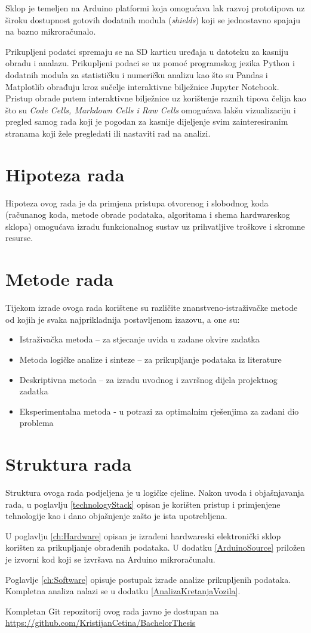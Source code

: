 Sklop je temeljen na Arduino platformi koja omogućava lak razvoj prototipova uz široku dostupnost gotovih dodatnih modula (\textit{shields}) koji se jednostavno spajaju na bazno mikroračunalo.

Prikupljeni podatci spremaju se na SD karticu uređaja u datoteku za kasniju obradu i analazu.
Prikupljeni podaci se uz pomoć programskog jezika Python i dodatnih modula za statističku i numeričku analizu kao što su Pandas i Matplotlib obrađuju kroz sučelje interaktivne bilježnice Jupyter Notebook.
Pristup obrade putem interaktivne bilježnice uz korištenje raznih tipova čelija kao što su \textit{Code Cells, Markdown Cells i Raw Cells} omogućava lakšu vizualizaciju i pregled samog rada koji je pogodan za kasnije dijeljenje svim zainteresiranim stranama koji žele pregledati ili nastaviti rad na analizi.

\section{Hipoteza rada}
Hipoteza ovog rada je da primjena pristupa otvorenog i slobodnog koda (računanog koda, metode obrade podataka, algoritama i shema hardwareskog sklopa) omogućava izradu funkcionalnog sustav uz prihvatljive troškove i skromne resurse.

\section{Metode rada}
Tijekom izrade ovoga rada korištene su različite znanstveno-istraživačke metode od kojih je svaka najprikladnija postavljenom izazovu, a one su:
\begin{itemize}
\item Istraživačka metoda – za stjecanje uvida u zadane okvire zadatka
\item Metoda logičke analize i sinteze – za prikupljanje podataka iz literature
\item Deskriptivna metoda – za izradu uvodnog i završnog dijela projektnog zadatka
\item Eksperimentalna metoda - u potrazi za optimalnim rješenjima za zadani dio problema
\end{itemize}

\section{Struktura rada}
Struktura ovoga rada podjeljena je u logičke cjeline.
Nakon uvoda i objašnjavanja rada, u poglavlju \ref{technologyStack} opisan je korišten pristup i primjenjene tehnologije kao i dano objašnjenje zašto je ista upotrebljena.

U poglavlju \ref{ch:Hardware} opisan je izrađeni hardwareski elektronički sklop korišten za prikupljanje obrađenih podataka.
U dodatku \ref{ArduinoSource} priložen je izvorni kod koji se izvršava na Arduino mikroračunalu.

Poglavlje \ref{ch:Software} opisuje postupak izrade analize prikupljenih podataka.
Kompletna analiza nalazi se u dodatku \ref{AnalizaKretanjaVozila}.

Kompletan Git repozitorij ovog rada javno je dostupan na \url{https://github.com/KristijanCetina/BachelorThesis}